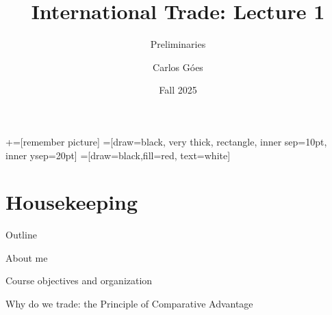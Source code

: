 \documentclass[notes,11pt, aspectratio=169, xcolor=table]{beamer}
\title[]{International Trade: Lecture 1}
\subtitle[]{Preliminaries}
\author[Góes]
{Carlos Góes\inst{1}}
\date{Fall 2025}
\institute[GWU]{\inst{1} George Washington University }
\newenvironment{wideitemize}{\itemize\addtolength{\itemsep}{10pt}}{\enditemize}
\begin{document}
\newcommand\marktopleft[1]{%
    \tikz[overlay,remember picture] 
        \node (marker-#1-a) at (-.3em,.3em) {};%
}
\newcommand\markbottomright[2]{%
    \tikz[overlay,remember picture] 
        \node (marker-#1-b) at (0em,0em) {};%
}
+=[remember picture] 
 =[draw=black, very thick, rectangle, inner sep=10pt, inner ysep=20pt]
 =[draw=black,fill=red, text=white]















\frame{\titlepage}
\addtocounter{framenumber}{-1}




\section{Housekeeping}

\begin{frame}{Outline}
\begin{wideitemize}
\item About me
\item Course objectives and organization
\item Why do we trade: the Principle of Comparative Advantage
    
\end{wideitemize}

\end{frame}
\end{document}
